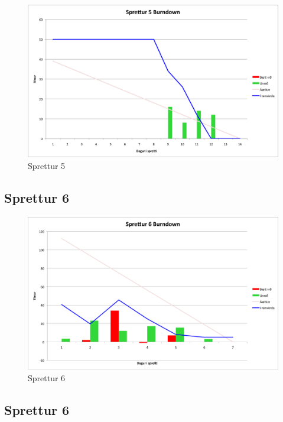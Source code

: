 \documentclass{article}
\begin{document}
\begin{figure}[H]
  \centering
  \includegraphics[width=1\textwidth]{Sprettur5_Burndown.png} 
  \caption{Sprettur 5} 
\end{figure}

\subsection{Sprettur 6}

\begin{figure}[H]
  \centering
  \includegraphics[width=1\textwidth]{Sprettur6_Burndown.png} 
  \caption{Sprettur 6} 
\end{figure}

\subsection{Sprettur 6}
\end{document}
